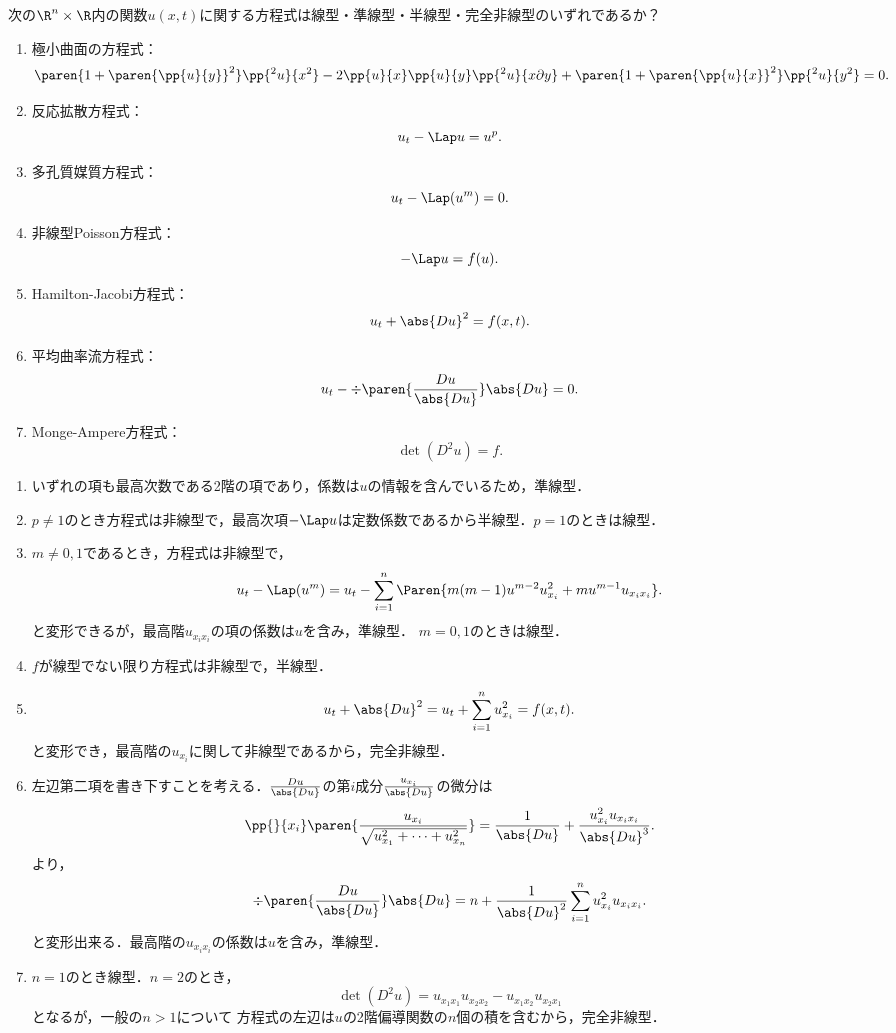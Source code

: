 \documentclass[uplatex,dvipdfmx]{jsreport}
\begin{document}
\begin{problem}
    次の$\R^n\times\R$内の関数$u(x,t)$に関する方程式は線型・準線型・半線型・完全非線型のいずれであるか？
    \begin{enumerate}
        \item 極小曲面の方程式：
        \[\paren{1+\paren{\pp{u}{y}}^2}\pp{^2u}{x^2}-2\pp{u}{x}\pp{u}{y}\pp{^2u}{x\partial y}+\paren{1+\paren{\pp{u}{x}}^2}\pp{^2u}{y^2}=0.\]
        \item 反応拡散方程式：
        \[u_t-\Lap u=u^p.\]
        \item 多孔質媒質方程式：
        \[u_t-\Lap(u^m)=0.\]
        \item 非線型Poisson方程式：
        \[-\Lap u=f(u).\]
        \item Hamilton-Jacobi方程式：
        \[u_t+\abs{Du}^2=f(x,t).\]
        \item 平均曲率流方程式：
        \[u_t-\div\paren{\frac{Du}{\abs{Du}}}\abs{Du}=0.\]
        \item Monge-Ampere方程式：
        \[\det(D^2u)=f.\]
    \end{enumerate}
\end{problem}
\begin{Proof}[\underline{\bf【解】}]\mbox{}
    \begin{enumerate}
        \item いずれの項も最高次数である2階の項であり，係数は$u$の情報を含んでいるため，準線型．
        \item $p\ne1$のとき方程式は非線型で，最高次項$-\Lap u$は定数係数であるから半線型．$p=1$のときは線型．
        \item $m\ne0,1$であるとき，方程式は非線型で，
        \[u_t-\Lap(u^m)=u_t-\sum_{i=1}^n\Paren{m(m-1)u^{m-2}u^2_{x_i}+mu^{m-1}u_{x_ix_i}}.\]
        と変形できるが，最高階$u_{x_ix_i}$の項の係数は$u$を含み，準線型．
        $m=0,1$のときは線型．
        \item $f$が線型でない限り方程式は非線型で，半線型．
        \item \[u_t+\abs{Du}^2=u_t+\sum_{i=1}^nu_{x_i}^2=f(x,t).\]
        と変形でき，最高階の$u_{x_i}$に関して非線型であるから，完全非線型．
        \item 左辺第二項を書き下すことを考える．$\frac{Du}{\abs{Du}}$の第$i$成分$\frac{u_{x_i}}{\abs{Du}}$の微分は
        \[\pp{}{x_i}\paren{\frac{u_{x_i}}{\sqrt{u_{x_1}^2+\cdots+u_{x_n}^2}}}=\frac{1}{\abs{Du}}+\frac{u_{x_i}^2u_{x_ix_i}}{\abs{Du}^3}.\]
        より，
        \[\div\paren{\frac{Du}{\abs{Du}}}\abs{Du}=n+\frac{1}{\abs{Du}^2}\sum_{i=1}^nu_{x_i}^2u_{x_ix_i}.\]
        と変形出来る．最高階の$u_{x_ix_i}$の係数は$u$を含み，準線型．
        \item $n=1$のとき線型．$n=2$のとき，
        \[\det(D^2u)=u_{x_1x_1}u_{x_2x_2}-u_{x_1x_2}u_{x_2x_1}\]
        となるが，一般の$n>1$について
        方程式の左辺は$u$の2階偏導関数の$n$個の積を含むから，完全非線型．
    \end{enumerate}
\end{Proof}
\end{document}
